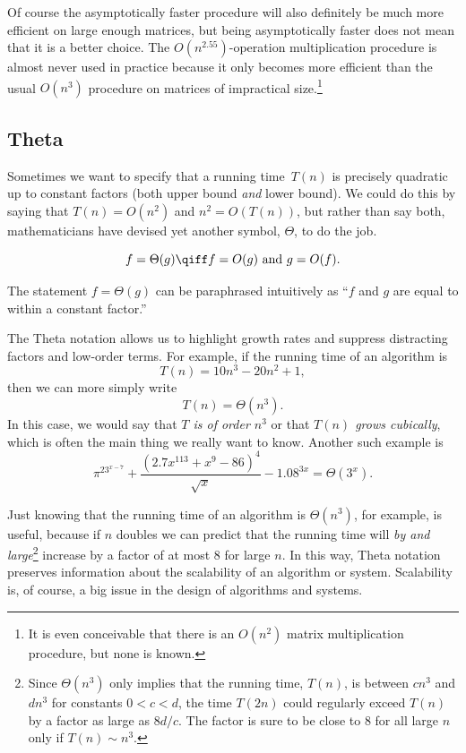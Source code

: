 Of course the asymptotically faster procedure will also definitely be
much more efficient on large enough matrices, but being asymptotically
faster does not mean that it is a better choice.  The
$O(n^{2.55})$-operation multiplication procedure is almost never used
in practice because it only becomes more efficient than the usual
$O(n^3)$ procedure on matrices of impractical size.\footnote{It is
  even conceivable that there is an $O(n^2)$ matrix multiplication
  procedure, but none is known.}

\subsection{\index{$\Theta()$}Theta}

Sometimes we want to specify that a running time~$T(n)$ is precisely
quadratic up to constant factors (both upper bound \emph{and} lower
bound).  We could do this by saying that $T(n) = O(n^2)$ and $n^2 =
O(T(n))$, but rather than say both, mathematicians have devised yet
another symbol, $\Theta$, to do the job.

\begin{definition}\label{def:Theta}
\[
    f = \Theta(g)
    \qiff
    f=O(g) \text{ and } g=O(f).
\]
\end{definition}

The statement $f = \Theta(g)$ can be paraphrased intuitively as
``$f$ and $g$ are equal to within a constant factor.''

The Theta notation allows us to highlight growth rates and suppress
distracting factors and low-order terms.  For example, if the running
time of an algorithm is
\[
T(n) = 10n^3 - 20n^2 + 1,
\]
then we can more simply write
\[
T(n) = \Theta(n^3).
\]
In this case, we would say that \emph{$T$ is of order $n^3$} or that
\emph{$T(n)$ grows cubically}, which is often the main thing we really
want to know.  Another such example is
\[
{{\pi^23^{x-7} + \frac{(2.7x^{113} + x^9- 86)^4}{\sqrt{x}} - 1.08^{3x}}} =
\Theta(3^x).
\]

Just knowing that the running time of an algorithm is $\Theta(n^3)$,
for example, is useful, because if $n$ doubles we can predict that the
running time will \emph{by and large}\footnote{Since $\Theta(n^3)$
  only implies that the running time, $T(n)$, is between $cn^3$ and
  $dn^3$ for constants $0<c<d$, the time $T(2n)$ could regularly
  exceed $T(n)$ by a factor as large as $8d/c$.  The factor is sure to
  be close to 8 for all large $n$ only if $T(n) \sim n^3$.} increase
by a factor of at most $8$ for large $n$.  In this way, Theta notation
preserves information about the scalability of an algorithm or system.
Scalability is, of course, a big issue in the design of algorithms and
systems.


